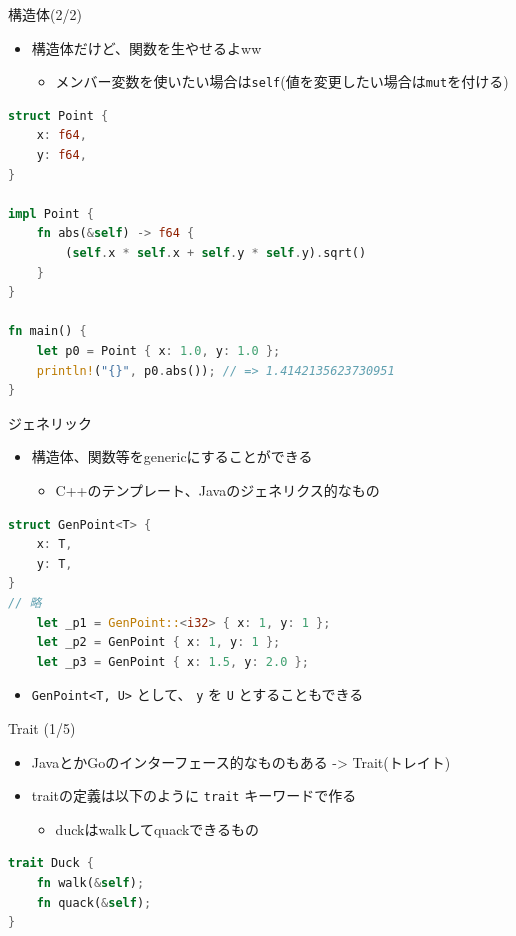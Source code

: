 \documentclass[cjk,dvipdfmx,10pt,compress,fragile%
hyperref={bookmarks=true,bookmarksnumbered=true,bookmarksopen=false,%
colorlinks=false,%
pdftitle={第 134 回 関西 Debian 勉強会},%
pdfauthor={小林},%
pdfsubject={資料},%
}]{beamer}
\begin{document}
\begin{frame}[t,fragile]{構造体(2/2)}
\begin{itemize}
 \item 構造体だけど、関数を生やせるよww
       \begin{itemize}
	\item メンバー変数を使いたい場合は\texttt{self}(値を変更したい場合は\texttt{mut}を付ける)
       \end{itemize}
\end{itemize}
\begin{lstlisting}[language=Rust,style=boxed,style=colouredRust,basicstyle=\small\tt,lineskip=-2pt]
struct Point {
    x: f64,
    y: f64,
}

impl Point {
    fn abs(&self) -> f64 {
        (self.x * self.x + self.y * self.y).sqrt()
    }
}

fn main() {
    let p0 = Point { x: 1.0, y: 1.0 };
    println!("{}", p0.abs()); // => 1.4142135623730951
}\end{lstlisting}
\end{frame}

\begin{frame}[t,fragile]{ジェネリック}
\begin{itemize}
 \item 構造体、関数等をgenericにすることができる
       \begin{itemize}
	\item C++のテンプレート、Javaのジェネリクス的なもの
       \end{itemize}
\end{itemize}
\begin{lstlisting}[language=Rust,style=boxed,style=colouredRust,basicstyle=\small\tt,lineskip=-2pt]
struct GenPoint<T> {
    x: T,
    y: T,
}
// 略
    let _p1 = GenPoint::<i32> { x: 1, y: 1 };
    let _p2 = GenPoint { x: 1, y: 1 };
    let _p3 = GenPoint { x: 1.5, y: 2.0 };
\end{lstlisting}
\begin{itemize}
 \item \verb|GenPoint<T, U>| として、 \texttt{y} を \texttt{U} とすることもできる
\end{itemize}
\end{frame}

\begin{frame}[t,fragile]{Trait (1/5)}
 \begin{itemize}
  \item JavaとかGoのインターフェース的なものもある -> Trait(トレイト)
  \item traitの定義は以下のように \texttt{trait} キーワードで作る
	\begin{itemize}
	 \item duckはwalkしてquackできるもの
	\end{itemize}
 \end{itemize}
\begin{lstlisting}[language=Rust,style=boxed,style=colouredRust,basicstyle=\small\tt,lineskip=-2pt]
trait Duck {
    fn walk(&self);
    fn quack(&self);
}\end{lstlisting}
\end{frame}
\end{document}
